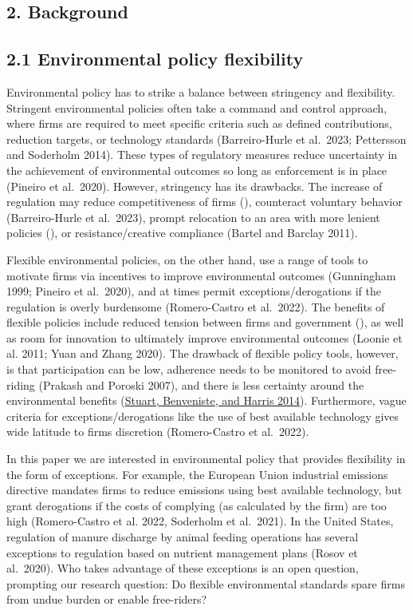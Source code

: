 \documentclass[twoside,12pt,final]{ucthesis-CA2012}
\begin{document}
\begin{ucmainmatter}
\hypertarget{background}{%
\section{2. Background}\label{background}}

\hypertarget{environmental-policy-flexibility}{%
\subsection{2.1 Environmental policy flexibility}\label{environmental-policy-flexibility}}

Environmental policy has to strike a balance between stringency and
flexibility. Stringent environmental policies often take a command and
control approach, where firms are required to meet specific criteria
such as defined contributions, reduction targets, or technology
standards (Barreiro-Hurle et al.~2023; Pettersson and Soderholm 2014).
These types of regulatory measures reduce uncertainty in the achievement
of environmental outcomes so long as enforcement is in place (Pineiro et
al.~2020). However, stringency has its drawbacks. The increase of
regulation may reduce competitiveness of firms (), counteract voluntary
behavior (Barreiro-Hurle et al.~2023), prompt relocation to an area with
more lenient policies (), or resistance/creative compliance (Bartel and
Barclay 2011).

Flexible environmental policies, on the other hand, use a range of tools
to motivate firms via incentives to improve environmental outcomes
(Gunningham 1999; Pineiro et al.~2020), and at times permit
exceptions/derogations if the regulation is overly burdensome
(Romero-Castro et al.~2022). The benefits of flexible policies include
reduced tension between firms and government (), as well as room for
innovation to ultimately improve environmental outcomes (Loonie et al.
2011; Yuan and Zhang 2020). The drawback of flexible policy tools,
however, is that participation can be low, adherence needs to be
monitored to avoid free-riding (Prakash and Poroski 2007), and there is
less certainty around the environmental benefits
(\protect\hyperlink{ref-Stuart_Benveniste_Harris_2014}{Stuart, Benveniste, and Harris 2014}).
Furthermore, vague criteria for exceptions/derogations like the use of
\textquotesingle best available technology\textquotesingle{} gives wide latitude to firms\textquotesingle{} discretion
(Romero-Castro et al.~2022).

In this paper we are interested in environmental policy that provides
flexibility in the form of exceptions. For example, the European Union
industrial emissions directive mandates firms to reduce emissions using
\textquotesingle best available technology\textquotesingle, but grant derogations if the costs of
complying (as calculated by the firm) are too high (Romero-Castro et al.
2022, Soderholm et al.~2021). In the United States, regulation of manure
discharge by animal feeding operations has several exceptions to
regulation based on nutrient management plans (Rosov et al.~2020). Who
takes advantage of these exceptions is an open question, prompting our
research question: Do flexible environmental standards spare firms from
undue burden or enable free-riders?


\end{ucmainmatter}
\end{document}
